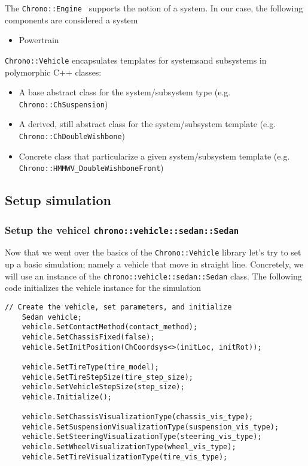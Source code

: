 The \lstinline{Chrono::Engine } supports the notion of a system. In our case, the following components are considered a system

\begin{itemize}
\item Powertrain
\end{itemize}

\lstinline{Chrono::Vehicle} encapsulates templates for systemsand subsystems in polymorphic C++ classes:

\begin{itemize}
\item A base abstract class for the system/subsystem type (e.g. \lstinline{Chrono::ChSuspension})
\item A derived, still abstract class for the system/subsystem template (e.g.  \lstinline{Chrono::ChDoubleWishbone})
\item Concrete class that particularize a given system/subsystem template (e.g. \lstinline{Chrono::HMMWV_DoubleWishboneFront})
\end{itemize}

\subsection{Setup simulation}

\subsubsection{Setup the vehicel \lstinline{chrono::vehicle::sedan::Sedan}}

Now that we went over the basics of the \lstinline{Chrono::Vehicle} library let's try to set up a basic simulation; namely a vehicle that move in straight line.
Concretely, we will use an instance of the \lstinline{chrono::vehicle::sedan::Sedan} class. The following code initializes the vehicle instance for the simulation

\begin{lstlisting}
// Create the vehicle, set parameters, and initialize
    Sedan vehicle;
    vehicle.SetContactMethod(contact_method);
    vehicle.SetChassisFixed(false);
    vehicle.SetInitPosition(ChCoordsys<>(initLoc, initRot));
    
    vehicle.SetTireType(tire_model);
    vehicle.SetTireStepSize(tire_step_size);
    vehicle.SetVehicleStepSize(step_size);
    vehicle.Initialize();

    vehicle.SetChassisVisualizationType(chassis_vis_type);
    vehicle.SetSuspensionVisualizationType(suspension_vis_type);
    vehicle.SetSteeringVisualizationType(steering_vis_type);
    vehicle.SetWheelVisualizationType(wheel_vis_type);
    vehicle.SetTireVisualizationType(tire_vis_type);
\end{lstlisting}


